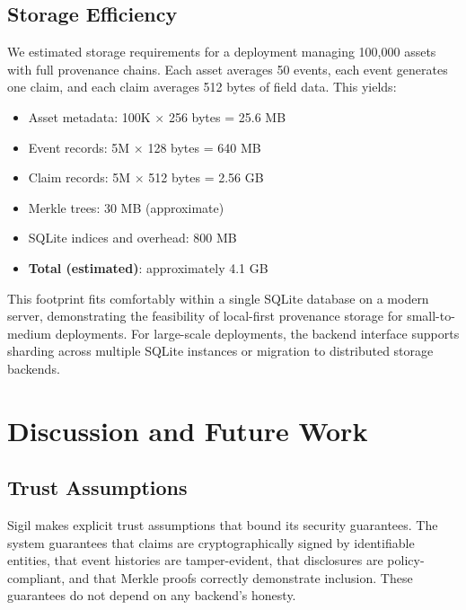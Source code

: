 \documentclass[conference]{IEEEtran}
\begin{document}
\subsection{Storage Efficiency}

We estimated storage requirements for a deployment managing 100,000 assets
with full provenance chains.  Each asset averages 50 events, each event
generates one claim, and each claim averages 512 bytes of field data.  This
yields:

\begin{itemize}
  \item Asset metadata: 100K $\times$ 256 bytes = 25.6 MB
  \item Event records: 5M $\times$ 128 bytes = 640 MB
  \item Claim records: 5M $\times$ 512 bytes = 2.56 GB
  \item Merkle trees: 30 MB (approximate)
  \item SQLite indices and overhead: 800 MB
  \item \textbf{Total (estimated)}: approximately 4.1 GB
\end{itemize}

This footprint fits comfortably within a single SQLite database on a modern
server, demonstrating the feasibility of local-first provenance storage for
small-to-medium deployments.  For large-scale deployments, the backend
interface supports sharding across multiple SQLite instances or migration to
distributed storage backends.


\section{Discussion and Future Work}

\subsection{Trust Assumptions}

Sigil makes explicit trust assumptions that bound its security guarantees.
The system guarantees that claims are cryptographically signed by identifiable
entities, that event histories are tamper-evident, that disclosures are
policy-compliant, and that Merkle proofs correctly demonstrate inclusion.
These guarantees do not depend on any backend's honesty.
\end{document}
